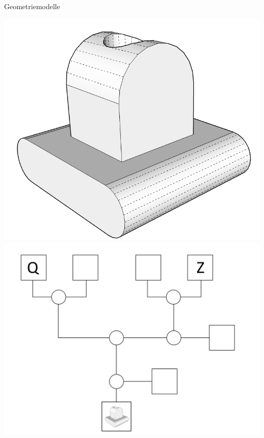 \documentclass[
	ngerman,
	color = black,
	]{tudaexercise}
\begin{document}
\begin{task}[credit=13 P]{Geometriemodelle}
\begin{subtask}[credit=9 P]
		\begin{multicols}{2}
			\includegraphics[width=.5\textwidth]{Grdl_Klausur_A1b.png}
			\columnbreak
			\includegraphics[width=.5\textwidth]{Graph-b-smaller.png}
		\end{multicols}
	\end{subtask}

	
\end{task}
\end{document}

